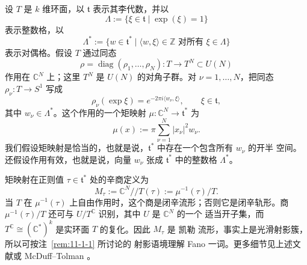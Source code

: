 设 $T$ 是 $k$ 维环面，以 $\mathfrak t$ 表示其李代数，并以
\[
  \Lambda:=\{\xi\in\mathfrak t\mid\exp(\xi)=1\}
\]
表示整数格，以
\[
  \Lambda^*:=\{w\in\mathfrak t^*\mid
  \langle w,\xi\rangle\in\mathbb Z\text{ 对所有 }\xi\in\Lambda\}
\]
表示对偶格。假设 $T$ 通过同态
\[
  \rho=\operatorname{diag}(\rho_1,\ldots,\rho_N):
  T\longrightarrow T^N\subset U(N)
\]
作用在 $\mathbb C^N$ 上；这里 $T^N$ 是 $U(N)$ 的对角子群。对
$\nu=1,\ldots,N$，把同态 $\rho_\nu:T\to S^1$ 写成
\begin{equation}\label{eq:11-3-1}
  \rho_\nu(\exp\xi)=e^{-2\pi i\langle w_\nu,\xi\rangle},
  \qquad \xi\in\mathfrak t,
\end{equation}
其中 $w_\nu\in\Lambda^*$。这个作用的一个矩映射
$\mu:\mathbb C^N\to\mathfrak t^*$ 为
\begin{equation}\label{eq:11-3-2}
  \mu(x):=\pi\sum_{\nu=1}^N|x_\nu|^2w_\nu.
\end{equation}
我们假设矩映射是恰当的，也就是说，$\mathfrak t^*$ 中存在一个包含所有 $w_\nu$ 的开半
空间。还假设作用有效，也就是说，向量 $w_\nu$ 张成 $\mathfrak t^*$ 中的整数格
$\Lambda^*$。

矩映射在正则值 $\tau\in\mathfrak t^*$ 处的辛商定义为
\[
  M_\tau:=\mathbb C^N/\!/T(\tau):=\mu^{-1}(\tau)/T.
\]
当 $T$ 在 $\mu^{-1}(\tau)$ 上自由作用时，这个商是闭辛流形；否则它是闭辛轨形。商
$\mu^{-1}(\tau)/T$ 还可与 $U/T^{\mathbb C}$ 识别，其中 $U$ 是 $\mathbb C^N$ 的一个
适当开子集，而 $T^{\mathbb C}\cong(\mathbb C^*)^k$ 是实环面 $T$ 的复化。因此
$M_\tau$ 是 凯勒 流形，事实上是光滑射影簇，所以可按注~\ref{rem:11-1-1} 所讨论的
射影语境理解 Fano 一词。更多细节见上述文献或 McDuff--Tolman
。

